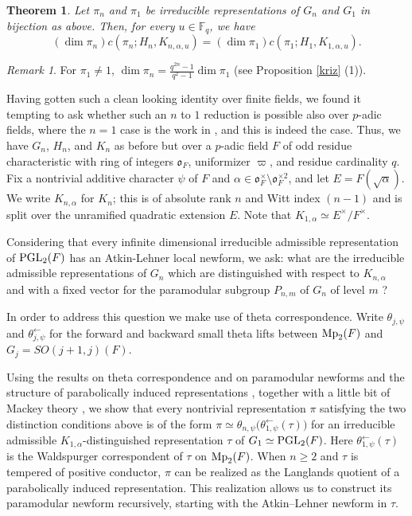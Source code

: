 \documentclass[12pt]{amsart}
\newtheorem{theorem}{Theorem}[section] %
\theoremstyle{definition}
\theoremstyle{remark}
\newtheorem{remark}{Remark}
\begin{document}
\begin{theorem}\label{thm1} 
Let $\pi_n$ and $\pi_1$ be irreducible representations of $G_n$ and $G_1$ in bijection as above.
Then, for every $u\in\mathbb F_q$, we have
\[
(\dim\pi_n) c(\pi_n;H_n,K_{n,\alpha,u})
=
(\dim\pi_1) c(\pi_1;H_1,K_{1,\alpha,u}).
\]
\end{theorem}

\begin{remark}\label{rmk-thm1}
For $\pi_1 \neq 1$, $\dim \pi_n = \frac{q^{2n}-1}{q^2-1}\dim \pi_1$ (see Proposition \ref{kriz} (1)).
\end{remark}

Having gotten such a clean looking identity over finite fields, we found it tempting to ask whether such an $n$ to $1$ reduction is possible also over $p$-adic fields, where the $n=1$ case is the work in \cite[\S 7.1]{bhko24}, and this is indeed the case. Thus, we have $G_n$, $H_n$, and $K_n$ as before but over a $p$-adic field $F$ of odd residue characteristic with ring of integers $\mathfrak o_F$, uniformizer $\varpi$, and residue cardinality $q$. Fix a nontrivial additive character $\psi$ of $F$ and $\alpha \in \mathfrak o_F^\times \setminus \mathfrak o_F^{\times 2}$, and let $E=F(\sqrt{\alpha})$. We write $K_{n,\alpha}$ for $K_n$; this is of absolute rank $n$ and Witt index $(n-1)$ and is split over the unramified quadratic extension $E$. Note that $K_{1,\alpha}\simeq E^\times/F^\times$.

Considering that every infinite dimensional irreducible admissible representation of ${\rm PGL}_2(F)$ has an Atkin-Lehner local newform, we ask: what are the irreducible admissible representations of $G_n$ which are distinguished with respect to $K_{n,\alpha}$ and with a fixed vector for the paramodular subgroup $P_{n,m}$ of $G_n$ of level $m$ \cite{tsa13,gro16}? 

In order to address this question we make use of theta correspondence. Write $\theta_{j,\psi}$ and $\theta_{j,\psi}^{\leftarrow}$ for the forward and backward small theta lifts between ${\rm Mp}_2(F)$ and $G_j=SO(j+1,j)(F)$. 

Using the results on theta correspondence \cite{gt16,ggp20} and on paramodular newforms and the structure of parabolically induced representations  \cite{jan96,rs07,che26}, together with a little bit of Mackey theory \cite[\S 15]{ggp12}, we show that every nontrivial representation $\pi$ satisfying the two distinction conditions above is of the form
$\pi \simeq \theta_{n,\psi}\bigl(\theta^{\leftarrow}_{1,\psi}(\tau)\bigr)$ 
for an irreducible admissible $K_{1,\alpha}$-distinguished representation $\tau$ of $G_1\simeq {\rm PGL}_2(F)$. Here $\theta^{\leftarrow}_{1,\psi}(\tau)$ is the Waldspurger correspondent of $\tau$ on ${\rm Mp}_2(F)$. When $n\ge 2$ and $\tau$ is tempered of positive conductor, $\pi$ can be realized as the Langlands quotient of a parabolically induced representation. This realization allows us to construct its paramodular newform recursively, starting with the Atkin–Lehner newform in $\tau$.
\end{document}
